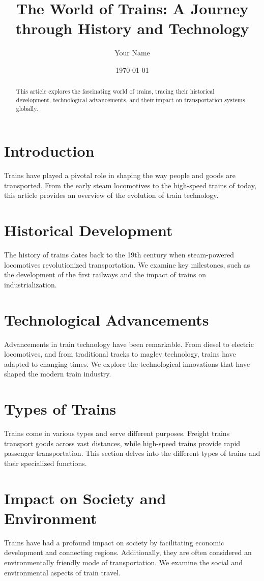 \documentclass[a4paper,12pt]{article}
\title{The World of Trains: A Journey through History and Technology}
\author{Your Name}
\date{\today}
\begin{document}
\maketitle

\begin{abstract}
    This article explores the fascinating world of trains, tracing their historical development, technological advancements, and their impact on transportation systems globally.
\end{abstract}

\section{Introduction}
Trains have played a pivotal role in shaping the way people and goods are transported. From the early steam locomotives to the high-speed trains of today, this article provides an overview of the evolution of train technology.

\section{Historical Development}
The history of trains dates back to the 19th century when steam-powered locomotives revolutionized transportation. We examine key milestones, such as the development of the first railways and the impact of trains on industrialization.

\section{Technological Advancements}
Advancements in train technology have been remarkable. From diesel to electric locomotives, and from traditional tracks to maglev technology, trains have adapted to changing times. We explore the technological innovations that have shaped the modern train industry.

\section{Types of Trains}
Trains come in various types and serve different purposes. Freight trains transport goods across vast distances, while high-speed trains provide rapid passenger transportation. This section delves into the different types of trains and their specialized functions.

\section{Impact on Society and Environment}
Trains have had a profound impact on society by facilitating economic development and connecting regions. Additionally, they are often considered an environmentally friendly mode of transportation. We examine the social and environmental aspects of train travel.
\end{document}
